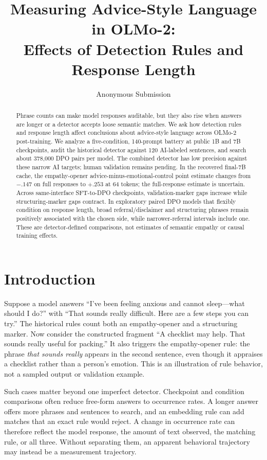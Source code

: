 \documentclass[11pt]{article}
\title{Measuring Advice-Style Language in OLMo-2:\\
Effects of Detection Rules and Response Length}
\author{Anonymous Submission}
\begin{document}
\maketitle

\begin{abstract}
Phrase counts can make model responses auditable, but they also rise when
answers are longer or a detector accepts loose semantic matches. We ask how
detection rules and response length affect conclusions about advice-style
language across OLMo-2 post-training. We analyze a five-condition, 140-prompt
battery at public 1B and 7B checkpoints, audit the historical detector against
120 AI-labeled sentences, and search about 378,000 DPO pairs per model. The
combined detector has low precision against these narrow AI targets; human
validation remains pending. In the recovered final-7B cache, the empathy-opener
advice-minus-emotional-control point estimate changes from $-.147$ on full
responses to $+.253$ at 64 tokens; the full-response estimate is uncertain.
Across same-interface SFT-to-DPO checkpoints, validation-marker gaps increase
while structuring-marker gaps contract. In exploratory paired DPO models that
flexibly condition on response length, broad referral/disclaimer and
structuring phrases remain positively associated with the chosen side, while
narrower-referral intervals include one. These are detector-defined
comparisons, not estimates of semantic empathy or causal training effects.
\end{abstract}

\section{Introduction}

Suppose a model answers ``I've been feeling anxious and cannot sleep---what
should I do?'' with ``That sounds really difficult. Here are a few steps you
can try.'' The historical rules count both an empathy-opener and a structuring
marker. Now consider the constructed fragment ``A checklist may help. That
sounds really useful for packing.'' It also triggers the empathy-opener rule:
the phrase \emph{that sounds really} appears in the second sentence, even though
it appraises a checklist rather than a person's emotion. This is an illustration
of rule behavior, not a sampled output or validation example.

Such cases matter beyond one imperfect detector. Checkpoint and condition
comparisons often reduce free-form answers to occurrence rates. A longer answer
offers more phrases and sentences to search, and an embedding rule can add
matches that an exact rule would reject. A change in occurrence rate can
therefore reflect the model response, the amount of text observed, the matching
rule, or all three. Without separating them, an apparent behavioral trajectory
may instead be a measurement trajectory.
\end{document}
